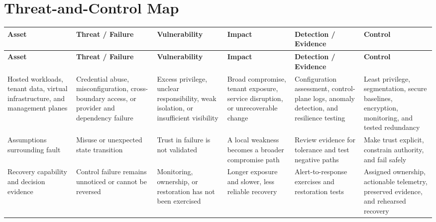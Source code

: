 \documentclass[11pt,letterpaper]{article}
\begin{document}
\section*{Threat-and-Control Map}
\begingroup\scriptsize\setlength{\tabcolsep}{2pt}
\begin{longtable}{>{\raggedright\arraybackslash}p{}>{\raggedright\arraybackslash}p{}>{\raggedright\arraybackslash}p{}>{\raggedright\arraybackslash}p{}>{\raggedright\arraybackslash}p{}>{\raggedright\arraybackslash}p{}}
\toprule\rowcolor{Navy}\color{white}\textbf{Asset} & \color{white}\textbf{Threat / Failure} & \color{white}\textbf{Vulnerability} & \color{white}\textbf{Impact} & \color{white}\textbf{Detection / Evidence} & \color{white}\textbf{Control}\\\midrule
\endfirsthead
\toprule\rowcolor{Navy}\color{white}\textbf{Asset} & \color{white}\textbf{Threat / Failure} & \color{white}\textbf{Vulnerability} & \color{white}\textbf{Impact} & \color{white}\textbf{Detection / Evidence} & \color{white}\textbf{Control}\\\midrule
\endhead
Hosted workloads, tenant data, virtual infrastructure, and management planes & Credential abuse, misconfiguration, cross-boundary access, or provider and dependency failure & Excess privilege, unclear responsibility, weak isolation, or insufficient visibility & Broad compromise, tenant exposure, service disruption, or unrecoverable change & Configuration assessment, control-plane logs, anomaly detection, and resilience testing & Least privilege, segmentation, secure baselines, encryption, monitoring, and tested redundancy\\\midrule
Assumptions surrounding fault & Misuse or unexpected state transition & Trust in failure is not validated & A local weakness becomes a broader compromise path & Review evidence for tolerance and test negative paths & Make trust explicit, constrain authority, and fail safely\\\midrule
Recovery capability and decision evidence & Control failure remains unnoticed or cannot be reversed & Monitoring, ownership, or restoration has not been exercised & Longer exposure and slower, less reliable recovery & Alert-to-response exercises and restoration tests & Assigned ownership, actionable telemetry, preserved evidence, and rehearsed recovery\\\midrule
\bottomrule
\end{longtable}
\endgroup
\end{document}

